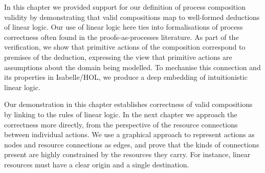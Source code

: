 \documentclass[class=smolathesis,crop=false]{standalone}
\begin{document}
In this chapter we provided support for our definition of process composition validity by demonstrating that valid compositions map to well-formed deductions of linear logic.
Our use of linear logic here ties into formalisations of process correctness often found in the proofs-as-processes literature.
As part of the verification, we show that primitive actions of the composition correspond to premises of the deduction, expressing the view that primitive actions are assumptions about the domain being modelled.
To mechanise this connection and its properties in Isabelle/HOL, we produce a deep embedding of intuitionistic linear logic.

Our demonstration in this chapter establishes correctness of valid compositions by linking to the rules of linear logic.
In the next chapter we approach the correctness more directly, from the perspective of the resource connections between individual actions.
We use a graphical approach to represent actions as nodes and resource connections as edges, and prove that the kinds of connections present are highly constrained by the resources they carry.
For instance, linear resources must have a clear origin and a single destination.

\ifstandalone


\fi
\end{document}
